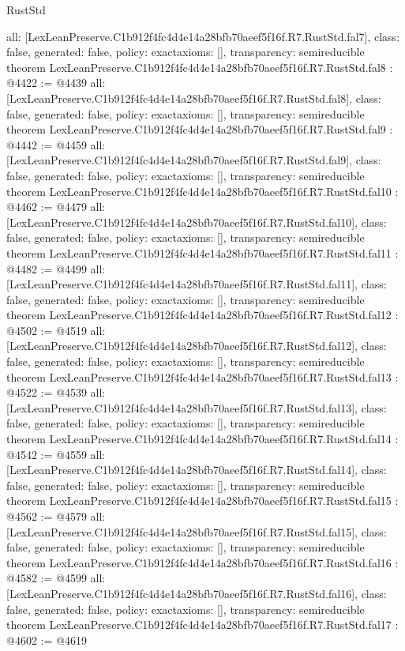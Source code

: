 \begin{lexlean}{RustStd}
\begin{coremodule}
{  all: [LexLeanPreserve.C1b912f4fc4d4e14a28bfb70aeef5f16f.R7.RustStd.fal7],
  class: false,
  generated: false,
  policy: exact{axioms: []},
  transparency: semireducible
}
theorem LexLeanPreserve.C1b912f4fc4d4e14a28bfb70aeef5f16f.R7.RustStd.fal8 : @4422 := @4439 {
  all: [LexLeanPreserve.C1b912f4fc4d4e14a28bfb70aeef5f16f.R7.RustStd.fal8],
  class: false,
  generated: false,
  policy: exact{axioms: []},
  transparency: semireducible
}
theorem LexLeanPreserve.C1b912f4fc4d4e14a28bfb70aeef5f16f.R7.RustStd.fal9 : @4442 := @4459 {
  all: [LexLeanPreserve.C1b912f4fc4d4e14a28bfb70aeef5f16f.R7.RustStd.fal9],
  class: false,
  generated: false,
  policy: exact{axioms: []},
  transparency: semireducible
}
theorem LexLeanPreserve.C1b912f4fc4d4e14a28bfb70aeef5f16f.R7.RustStd.fal10 : @4462 := @4479 {
  all: [LexLeanPreserve.C1b912f4fc4d4e14a28bfb70aeef5f16f.R7.RustStd.fal10],
  class: false,
  generated: false,
  policy: exact{axioms: []},
  transparency: semireducible
}
theorem LexLeanPreserve.C1b912f4fc4d4e14a28bfb70aeef5f16f.R7.RustStd.fal11 : @4482 := @4499 {
  all: [LexLeanPreserve.C1b912f4fc4d4e14a28bfb70aeef5f16f.R7.RustStd.fal11],
  class: false,
  generated: false,
  policy: exact{axioms: []},
  transparency: semireducible
}
theorem LexLeanPreserve.C1b912f4fc4d4e14a28bfb70aeef5f16f.R7.RustStd.fal12 : @4502 := @4519 {
  all: [LexLeanPreserve.C1b912f4fc4d4e14a28bfb70aeef5f16f.R7.RustStd.fal12],
  class: false,
  generated: false,
  policy: exact{axioms: []},
  transparency: semireducible
}
theorem LexLeanPreserve.C1b912f4fc4d4e14a28bfb70aeef5f16f.R7.RustStd.fal13 : @4522 := @4539 {
  all: [LexLeanPreserve.C1b912f4fc4d4e14a28bfb70aeef5f16f.R7.RustStd.fal13],
  class: false,
  generated: false,
  policy: exact{axioms: []},
  transparency: semireducible
}
theorem LexLeanPreserve.C1b912f4fc4d4e14a28bfb70aeef5f16f.R7.RustStd.fal14 : @4542 := @4559 {
  all: [LexLeanPreserve.C1b912f4fc4d4e14a28bfb70aeef5f16f.R7.RustStd.fal14],
  class: false,
  generated: false,
  policy: exact{axioms: []},
  transparency: semireducible
}
theorem LexLeanPreserve.C1b912f4fc4d4e14a28bfb70aeef5f16f.R7.RustStd.fal15 : @4562 := @4579 {
  all: [LexLeanPreserve.C1b912f4fc4d4e14a28bfb70aeef5f16f.R7.RustStd.fal15],
  class: false,
  generated: false,
  policy: exact{axioms: []},
  transparency: semireducible
}
theorem LexLeanPreserve.C1b912f4fc4d4e14a28bfb70aeef5f16f.R7.RustStd.fal16 : @4582 := @4599 {
  all: [LexLeanPreserve.C1b912f4fc4d4e14a28bfb70aeef5f16f.R7.RustStd.fal16],
  class: false,
  generated: false,
  policy: exact{axioms: []},
  transparency: semireducible
}
theorem LexLeanPreserve.C1b912f4fc4d4e14a28bfb70aeef5f16f.R7.RustStd.fal17 : @4602 := @4619 {
}
\end{coremodule}
\end{lexlean}
